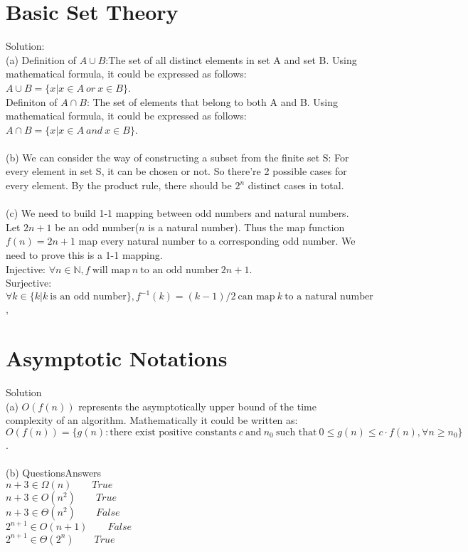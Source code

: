 \documentclass[11pt]{article}
\begin{document}
\section{Basic Set Theory}
Solution:\\
(a) Definition of $A\cup B$:The set of all distinct elements in set A and set B. Using mathematical formula, it could be expressed as follows: $A\cup B=\{x|x\in A~or~x\in B\}$.\\
Definiton of $A\cap B$: The set of elements that belong to both A and B. Using mathematical formula, it could be expressed as follows: $A\cap B=\{x|x\in A~and~x\in B\}$.\\
\\
(b) We can consider the way of constructing a subset from the finite set S: For every element in set S, it can be chosen or not. So there're 2 possible cases for every element. By the product rule, there should be $2^n$ distinct cases in total.\\
\\
(c) We need to build 1-1 mapping between odd numbers and natural numbers. Let $2n+1$ be an odd number($n$ is a natural number). Thus the map function $f(n)=2n+1$ map every natural number to a corresponding odd number. We need to prove this is a 1-1 mapping.\\
Injective: $\forall n \in \mathbb{N},f~\text{will map}~n~\text{to an odd number}~2n+1 $.\\
Surjective: $\forall k \in\{k|k~\text{is an odd number}\},f^{-1}(k)=(k-1)/2~ \text{can map}~k~\text{to a natural number}$, 


\section{Asymptotic Notations}
Solution\\
(a) $O(f(n))$ represents the asymptotically upper bound of the time complexity of an algorithm. Mathematically it could be written as:\\
$O(f(n))=\{g(n):\text{there exist positive constants}~c~\text{and}~n_0~\text{such that}~0\leq g(n)\leq c\cdot f(n),\forall n\geq n_0\}$.\\
\\
(b) Questions\qquad Answers\\
$n+3\in \Omega(n)\qquad True$\\
$n+3\in O(n^2)\qquad True$\\
$n+3 \in \Theta(n^2)\qquad False$\\
$2^{n+1}\in O(n+1)\qquad False$\\
$2^{n+1}\in \Theta(2^n)\qquad True$
\end{document}
